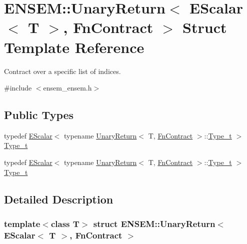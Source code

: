 \hypertarget{structENSEM_1_1UnaryReturn_3_01EScalar_3_01T_01_4_00_01FnContract_01_4}{}\section{E\+N\+S\+EM\+:\+:Unary\+Return$<$ E\+Scalar$<$ T $>$, Fn\+Contract $>$ Struct Template Reference}
\label{structENSEM_1_1UnaryReturn_3_01EScalar_3_01T_01_4_00_01FnContract_01_4}


Contract over a specific list of indices.  




{\ttfamily \#include $<$ensem\+\_\+ensem.\+h$>$}

\subsection*{Public Types}
\begin{DoxyCompactItemize}
\item 
typedef \mbox{\hyperlink{classENSEM_1_1EScalar}{E\+Scalar}}$<$ typename \mbox{\hyperlink{structENSEM_1_1UnaryReturn}{Unary\+Return}}$<$ T, \mbox{\hyperlink{structENSEM_1_1FnContract}{Fn\+Contract}} $>$\+::\mbox{\hyperlink{structENSEM_1_1UnaryReturn_3_01EScalar_3_01T_01_4_00_01FnContract_01_4_a0838f4fd4b6341784128502cc2256180}{Type\+\_\+t}} $>$ \mbox{\hyperlink{structENSEM_1_1UnaryReturn_3_01EScalar_3_01T_01_4_00_01FnContract_01_4_a0838f4fd4b6341784128502cc2256180}{Type\+\_\+t}}
\item 
typedef \mbox{\hyperlink{classENSEM_1_1EScalar}{E\+Scalar}}$<$ typename \mbox{\hyperlink{structENSEM_1_1UnaryReturn}{Unary\+Return}}$<$ T, \mbox{\hyperlink{structENSEM_1_1FnContract}{Fn\+Contract}} $>$\+::\mbox{\hyperlink{structENSEM_1_1UnaryReturn_3_01EScalar_3_01T_01_4_00_01FnContract_01_4_a0838f4fd4b6341784128502cc2256180}{Type\+\_\+t}} $>$ \mbox{\hyperlink{structENSEM_1_1UnaryReturn_3_01EScalar_3_01T_01_4_00_01FnContract_01_4_a0838f4fd4b6341784128502cc2256180}{Type\+\_\+t}}
\end{DoxyCompactItemize}


\subsection{Detailed Description}
\subsubsection*{template$<$class T$>$\newline
struct E\+N\+S\+E\+M\+::\+Unary\+Return$<$ E\+Scalar$<$ T $>$, Fn\+Contract $>$}

